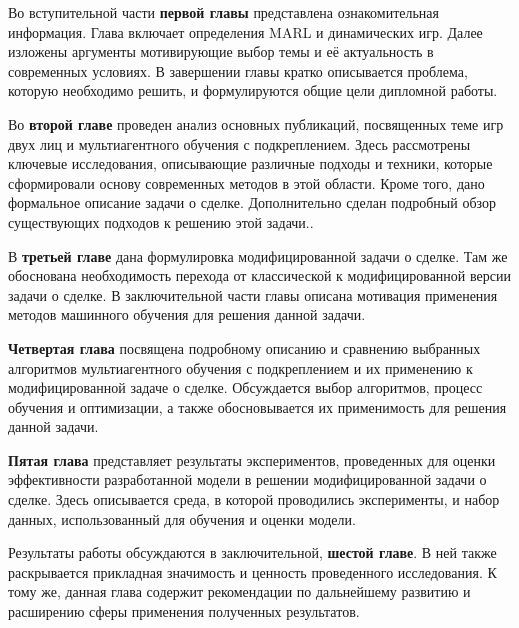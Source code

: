 Во вступительной части \textbf{первой главы} представлена ознакомительная информация. Глава включает определения MARL и динамических игр. Далее изложены аргументы мотивирующие выбор темы и её актуальность в современных условиях. В завершении главы кратко описывается проблема, которую необходимо решить, и формулируются общие цели дипломной работы.

Во \textbf{второй главе} проведен анализ основных публикаций, посвященных теме игр двух лиц и мультиагентного обучения с подкреплением. Здесь рассмотрены ключевые исследования, описывающие различные подходы и техники, которые сформировали основу современных методов в этой области. Кроме того, дано формальное описание задачи о сделке. Дополнительно сделан подробный обзор существующих подходов к решению этой задачи..

В \textbf{третьей главе} дана формулировка модифицированной задачи о сделке. Там же обоснована необходимость перехода от классической к модифицированной версии задачи о сделке. В заключительной части главы описана мотивация применения методов машинного обучения для решения данной задачи.

\textbf{Четвертая глава} посвящена подробному описанию и сравнению выбранных алгоритмов мультиагентного обучения с подкреплением и их применению к модифицированной задаче о сделке. Обсуждается выбор алгоритмов, процесс обучения и оптимизации, а также обосновывается их применимость для решения данной задачи.

\textbf{Пятая глава} представляет результаты экспериментов, проведенных для оценки эффективности разработанной модели в решении модифицированной задачи о сделке. Здесь описывается среда, в которой проводились эксперименты, и набор данных, использованный для обучения и оценки модели.

Результаты работы обсуждаются в заключительной, \textbf{шестой главе}. В ней также раскрывается прикладная значимость и ценность проведенного исследования. К тому же, данная глава содержит рекомендации по дальнейшему развитию и расширению сферы применения полученных результатов.
